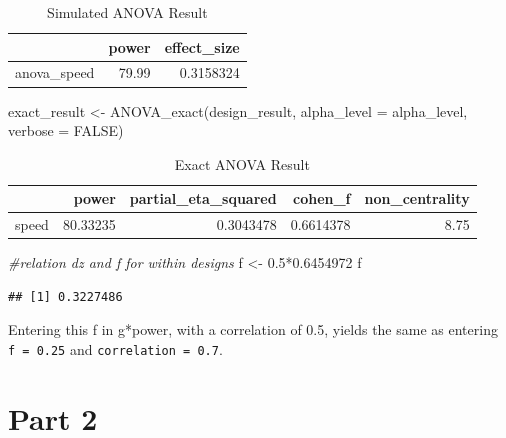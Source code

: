 \documentclass[
]{book}
\newenvironment{Shaded}{\begin{snugshade}}{\end{snugshade}}
\newcommand{\AttributeTok}[1]{\textcolor[rgb]{0.77,0.63,0.00}{#1}}
\newcommand{\CommentTok}[1]{\textcolor[rgb]{0.56,0.35,0.01}{\textit{#1}}}
\newcommand{\ConstantTok}[1]{\textcolor[rgb]{0.00,0.00,0.00}{#1}}
\newcommand{\FloatTok}[1]{\textcolor[rgb]{0.00,0.00,0.81}{#1}}
\newcommand{\FunctionTok}[1]{\textcolor[rgb]{0.00,0.00,0.00}{#1}}
\newcommand{\NormalTok}[1]{#1}
\newcommand{\OtherTok}[1]{\textcolor[rgb]{0.56,0.35,0.01}{#1}}
\newcommand{\SpecialCharTok}[1]{\textcolor[rgb]{0.00,0.00,0.00}{#1}}
\begin{document}
\begin{table}[!h]

\caption{\label{tab:unnamed-chunk-96}Simulated ANOVA Result}
\centering
\begin{tabular}[t]{l|r|r}
\hline
  & power & effect\_size\\
\hline
anova\_speed & 79.99 & 0.3158324\\
\hline
\end{tabular}
\end{table}

\begin{Shaded}
\begin{Highlighting}[]
\NormalTok{exact\_result }\OtherTok{\textless{}{-}} \FunctionTok{ANOVA\_exact}\NormalTok{(design\_result,}
                            \AttributeTok{alpha\_level =}\NormalTok{ alpha\_level,}
                            \AttributeTok{verbose =} \ConstantTok{FALSE}\NormalTok{)}
\end{Highlighting}
\end{Shaded}

\begin{table}[!h]

\caption{\label{tab:unnamed-chunk-98}Exact ANOVA Result}
\centering
\begin{tabular}[t]{l|r|r|r|r}
\hline
  & power & partial\_eta\_squared & cohen\_f & non\_centrality\\
\hline
speed & 80.33235 & 0.3043478 & 0.6614378 & 8.75\\
\hline
\end{tabular}
\end{table}

\begin{Shaded}
\begin{Highlighting}[]
\CommentTok{\#relation dz and f for within designs }
\NormalTok{f }\OtherTok{\textless{}{-}} \FloatTok{0.5}\SpecialCharTok{*}\FloatTok{0.6454972}
\NormalTok{f }
\end{Highlighting}
\end{Shaded}

\begin{verbatim}
## [1] 0.3227486
\end{verbatim}

Entering this f in g*power, with a correlation of 0.5, yields the same as entering \texttt{f\ =\ 0.25} and \texttt{correlation\ =\ 0.7}.

\newpage

\hypertarget{part-2}{%
\section{Part 2}\label{part-2}}
\end{document}
